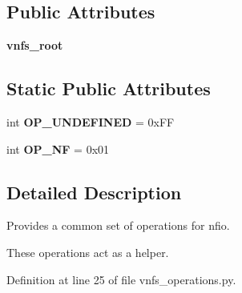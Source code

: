 \subsection*{Public Attributes}
\begin{DoxyCompactItemize}
\item 
\hypertarget{classvnfs__operations_1_1VNFSOperations_a88ae8c710ff0d9f76a72d2da2d736e34}{{\bfseries vnfs\-\_\-root}}\label{classvnfs__operations_1_1VNFSOperations_a88ae8c710ff0d9f76a72d2da2d736e34}

\end{DoxyCompactItemize}
\subsection*{Static Public Attributes}
\begin{DoxyCompactItemize}
\item 
\hypertarget{classvnfs__operations_1_1VNFSOperations_a4477fd75c80184251d2894d71e3dee5e}{int {\bfseries O\-P\-\_\-\-U\-N\-D\-E\-F\-I\-N\-E\-D} = 0x\-F\-F}\label{classvnfs__operations_1_1VNFSOperations_a4477fd75c80184251d2894d71e3dee5e}

\item 
\hypertarget{classvnfs__operations_1_1VNFSOperations_a1cde1da5a03e27b526f1a71e2a6244ff}{int {\bfseries O\-P\-\_\-\-N\-F} = 0x01}\label{classvnfs__operations_1_1VNFSOperations_a1cde1da5a03e27b526f1a71e2a6244ff}

\end{DoxyCompactItemize}


\subsection{Detailed Description}
Provides a common set of operations for nfio. 

These operations act as a helper. 

Definition at line 25 of file vnfs\-\_\-operations.\-py.



